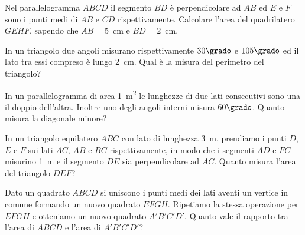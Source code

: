 \begin{multicols}{2}
\begin{esercizio}
\label{ese:7.109}
Nel parallelogramma $ABCD$ il segmento $BD$ è perpendicolare ad $AB$ 
ed $E$ e $F$ sono i punti medi di $AB$ e $CD$ rispettivamente. 
Calcolare l'area del quadrilatero $GEHF$, sapendo che $AB=5$~cm e 
$BD=2$~cm.
\end{esercizio}

%

\begin{esercizio}
\label{ese:7.110}
In un triangolo due angoli misurano rispettivamente $30\grado$ e 
$105\grado$ ed il lato tra essi compreso è lungo 2~cm. Qual è la 
misura del perimetro del triangolo? 
\end{esercizio}

\begin{esercizio}
\label{ese:7.111}
In un parallelogramma di area 1~m\textsuperscript{2} le lunghezze di 
due lati consecutivi sono una il doppio dell'altra. Inoltre uno degli 
angoli interni misura $60\grado$. Quanto misura la diagonale minore?
\end{esercizio}

\begin{esercizio}
\label{ese:7.112}
In un triangolo equilatero $ABC$ con lato di lunghezza 3~m, prendiamo 
i punti $D$, $E$ e $F$ sui lati $AC$, $AB$ e $BC$ rispettivamente, in 
modo che i segmenti $AD$ e $FC$ misurino 1~m e il segmento $DE$ sia 
perpendicolare ad $AC$. Quanto misura l'area del triangolo $DEF$?
\end{esercizio}

%

\begin{esercizio}
\label{ese:7.113}
Dato un quadrato $ABCD$ si uniscono i punti medi dei lati aventi un 
vertice in comune formando un nuovo quadrato $EFGH$. Ripetiamo la 
stessa operazione per $EFGH$ e otteniamo un nuovo quadrato 
$A'B'C'D'$. Quanto vale il rapporto tra l'area di $ABCD$ e l'area di 
$A'B'C'D'$?
\end{esercizio}

\end{multicols}

